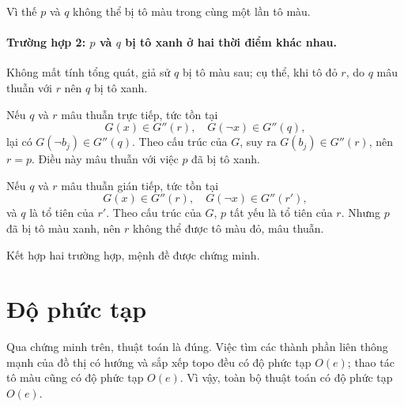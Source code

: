 \documentclass[11pt]{article}
\begin{document}
Vì thế $p$ và $q$ không thể bị tô màu trong cùng một lần tô màu.

\paragraph{Trường hợp 2: $p$ và $q$ bị tô xanh ở hai thời điểm khác nhau.}
Không mất tính tổng quát, giả sử $q$ bị tô màu sau; cụ thể, khi tô đỏ $r$, do
$q$ mâu thuẫn với $r$ nên $q$ bị tô xanh.

Nếu $q$ và $r$ mâu thuẫn trực tiếp, tức tồn tại
\[
  G(x)\in G''(r),\quad G(\neg x)\in G''(q),
\]
lại có $G(\neg b_j)\in G''(q)$. Theo cấu trúc của $G$, suy ra
$G(b_j)\in G''(r)$, nên $r=p$. Điều này mâu thuẫn với việc $p$ đã bị tô xanh.

Nếu $q$ và $r$ mâu thuẫn gián tiếp, tức tồn tại
\[
  G(x)\in G''(r),\quad G(\neg x)\in G''(r'),
\]
và $q$ là tổ tiên của $r'$. Theo cấu trúc của $G$, $p$ tất yếu là tổ tiên của
$r$. Nhưng $p$ đã bị tô màu xanh, nên $r$ không thể được tô màu đỏ, mâu thuẫn.

Kết hợp hai trường hợp, mệnh đề được chứng minh.

\section{Độ phức tạp}

Qua chứng minh trên, thuật toán là đúng. Việc tìm các thành phần liên thông
mạnh của đồ thị có hướng và sắp xếp topo đều có độ phức tạp $O(e)$; thao tác
tô màu cũng có độ phức tạp $O(e)$. Vì vậy, toàn bộ thuật toán có độ phức tạp
$O(e)$.
\end{document}
